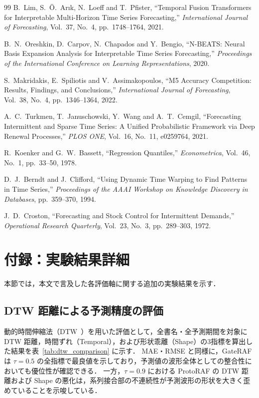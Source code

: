\documentclass[twocolumn, lastpage]{jarticle}
\begin{document}
\begin{thebibliography}{99}
B.~Lim, S.~\"{O}.~Ar{\i}k, N.~Loeff and T.~Pfister,
``Temporal Fusion Transformers for Interpretable Multi-Horizon Time Series Forecasting,''
\textit{International Journal of Forecasting}, Vol.~37, No.~4, pp.~1748--1764, 2021.

B.~N.~Oreshkin, D.~Carpov, N.~Chapados and Y.~Bengio,
``{N-BEATS}: Neural Basis Expansion Analysis for Interpretable Time Series Forecasting,''
\textit{Proceedings of the International Conference on Learning Representations}, 2020.

S.~Makridakis, E.~Spiliotis and V.~Assimakopoulos,
``M5 Accuracy Competition: Results, Findings, and Conclusions,''
\textit{International Journal of Forecasting}, Vol.~38, No.~4, pp.~1346--1364, 2022.

A.~C.~Turkmen, T.~Januschowski, Y.~Wang and A.~T.~Cemgil,
``Forecasting Intermittent and Sparse Time Series: A Unified Probabilistic Framework via Deep Renewal Processes,''
\textit{PLOS ONE}, Vol.~16, No.~11, e0259764, 2021.

R.~Koenker and G.~W.~Bassett,
``Regression Quantiles,''
\textit{Econometrica}, Vol.~46, No.~1, pp.~33--50, 1978.

D.~J.~Berndt and J.~Clifford,
``Using Dynamic Time Warping to Find Patterns in Time Series,''
\textit{Proceedings of the AAAI Workshop on Knowledge Discovery in Databases}, pp.~359--370, 1994.

J.~D.~Croston,
``Forecasting and Stock Control for Intermittent Demands,''
\textit{Operational Research Quarterly}, Vol.~23, No.~3, pp.~289--303, 1972.

\end{thebibliography}

\clearpage





\section{付録：実験結果詳細}
本節では，本文で言及した各評価軸に関する追加の実験結果を示す．

\subsection{DTW 距離による予測精度の評価}
動的時間伸縮法（DTW~\cite{Berndt.1994}）を用いた評価として，全書名・全予測期間を対象に DTW 距離，時間ずれ（Temporal），および形状乖離（Shape）の3指標を算出した結果を表~\ref{tab:dtw_comparison} に示す．
MAE・RMSE と同様に，GateRAF は $\tau=0.5$ の全指標で最良値を示しており，予測値の波形全体としての整合性においても優位性が確認できる．
一方，$\tau=0.9$ における ProtoRAF の DTW 距離および Shape の悪化は，系列接合部の不連続性が予測波形の形状を大きく歪めていることを示唆している．
\end{document}
